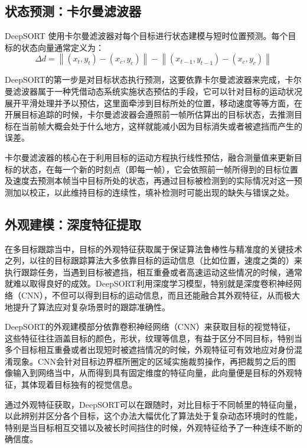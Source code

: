 \subsection{状态预测：卡尔曼滤波器}

DeepSORT 使用卡尔曼滤波器对每个目标进行状态建模与短时位置预测。每个目标的状态向量通常定义为：
\begin{equation}
	\Delta d = \left\| (x_t, y_t) - (x_c, y_c) \right\| - \left\| (x_{t-1}, y_{t-1}) - (x_c, y_c) \right\|
\end{equation}

DeepSORT的第一步是对目标状态执行预测，这要依靠卡尔曼滤波器来完成，卡尔曼滤波器属于一种凭借动态系统实施状态预估的手段，它可以针对目标的运动状况展开平滑处理并予以预估，这里面牵涉到目标所处的位置，移动速度等等方面，在开展目标追踪的时候，卡尔曼滤波器会遵照前一帧所估算出的目标状态，去推测目标在当前帧大概会处于什么地方，这样就能减小因为目标消失或者被遮挡而产生的误差。

卡尔曼滤波器的核心在于利用目标的运动方程执行线性预估，融合测量值来更新目标的状态，在每一个新的时刻点（即每一帧），它会依照前一帧所得到的目标位置及速度去预测本帧当中目标所处的状态，再通过目标被检测到的实际情况对这一预测加以校正，以此维持目标的连续性，填补检测时可能出现的缺失与错误之处。


\subsection{外观建模：深度特征提取}

在多目标跟踪当中，目标的外观特征获取属于保证算法鲁棒性与精准度的关键技术之列，以往的目标跟踪算法大多依靠目标的运动信息（比如位置，速度之类的）来执行跟踪任务，当遇到目标被遮挡，相互重叠或者高速运动这些情况的时候，通常就难以取得良好的成效。DeepSORT利用深度学习模型，特别就是深度卷积神经网络（CNN），不但可以得到目标的运动信息，而且还能融合其外观特征，从而极大地提升了算法应对复杂场景时的跟踪准确性。

DeepSORT的外观建模部分依靠卷积神经网络（CNN）来获取目标的视觉特征，这些特征往往涵盖目标的颜色，形状，纹理等信息，有益于区分不同目标，特别当多个目标相互重叠或者出现短时被遮挡情况的时候，外观特征可有效地应对身份混淆现象。CNN会针对目标边界框所圈定的区域实施裁剪操作，再把裁剪之后的图像输入到网络当中，从而得到具有固定维度的特征向量，此向量便是目标的外观特征，其体现着目标独有的视觉信息。

通过外观特征获取，DeepSORT可以在跟随时，对比目标于不同帧里的特征向量，以此辨别并区分各个目标，这个办法大幅优化了算法处于复杂动态环境时的性能，特别是当目标相互交错以及被长时间挡住的时候，外观特征给予了一种连续不断的确信度。

